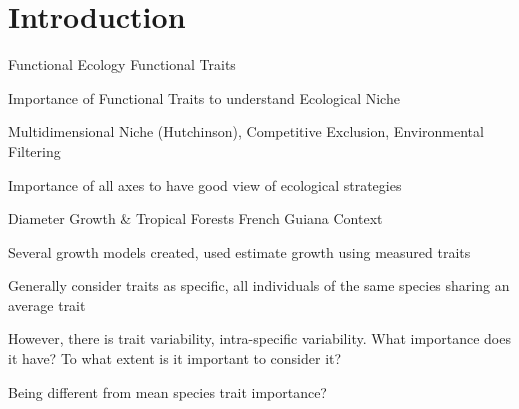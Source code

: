 \label{sec:Intro}
\section*{Introduction}

Functional Ecology \rightarrow Functional Traits

Importance of Functional Traits to understand Ecological Niche

Multidimensional Niche (Hutchinson), Competitive Exclusion, Environmental Filtering

Importance of all axes to have good view of ecological strategies

Diameter Growth \& Tropical Forests \rightarrow French Guiana Context

Several growth models created, used \rightarrow estimate growth using measured traits

Generally consider traits as specific, all individuals of the same species sharing an average trait

However, there is trait variability, intra-specific variability. What importance does it have? To what extent is it important to consider it? 

Being different from mean species trait \rightarrow importance?